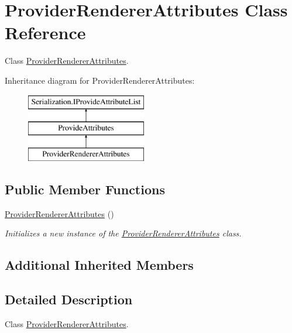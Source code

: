 \hypertarget{class_provider_renderer_attributes}{}\section{Provider\+Renderer\+Attributes Class Reference}
\label{class_provider_renderer_attributes}


Class \hyperlink{class_provider_renderer_attributes}{Provider\+Renderer\+Attributes}.  


Inheritance diagram for Provider\+Renderer\+Attributes\+:\begin{figure}[H]
\begin{center}
\leavevmode
\includegraphics[height=3.000000cm]{class_provider_renderer_attributes}
\end{center}
\end{figure}
\subsection*{Public Member Functions}
\begin{DoxyCompactItemize}
\item 
\hyperlink{class_provider_renderer_attributes_a0a9188e86d349d258dbd924149d150d4}{Provider\+Renderer\+Attributes} ()
\begin{DoxyCompactList}\small\item\em Initializes a new instance of the \hyperlink{class_provider_renderer_attributes}{Provider\+Renderer\+Attributes} class. \end{DoxyCompactList}\end{DoxyCompactItemize}
\subsection*{Additional Inherited Members}


\subsection{Detailed Description}
Class \hyperlink{class_provider_renderer_attributes}{Provider\+Renderer\+Attributes}. 



